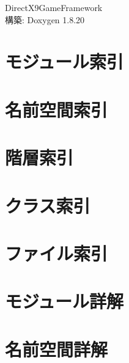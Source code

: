 \let\mypdfximage\pdfximage\def\pdfximage{\immediate\mypdfximage}\documentclass[twoside]{book}
\newcommand{\+}{\discretionary{\mbox{\scriptsize$\hookleftarrow$}}{}{}}
\newcommand{\clearemptydoublepage}{%
  \newpage{\pagestyle{empty}\cleardoublepage}%
}
\begin{document}
\begin{CJK}{UTF8}{min}

\hypersetup{pageanchor=false,
             bookmarksnumbered=true,
             pdfencoding=unicode
            }
\begin{titlepage}
\vspace*{7cm}
\begin{center}%
{\Large Direct\+X9\+Game\+Framework }\\
\vspace*{1cm}
{\large 構築\+: Doxygen 1.8.20}\\
\end{center}
\end{titlepage}
\clearemptydoublepage
{}
\tableofcontents
\clearemptydoublepage
{}
\hypersetup{pageanchor=true}

\chapter{モジュール索引}

\chapter{名前空間索引}

\chapter{階層索引}

\chapter{クラス索引}

\chapter{ファイル索引}

\chapter{モジュール詳解}

\chapter{名前空間詳解}






\end{CJK}
\end{document}
